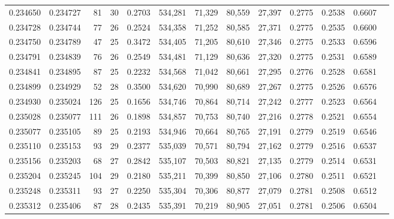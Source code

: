 \begin{tabular}{rrrrrrrrrrrrr}
0.234650 & 0.234727 &  81 &  30 &                                     0.2703 & 534,281 &  71,329 &  80,559 &  27,397 & 0.2775 & 0.2538 & 0.6607 \\
0.234728 & 0.234744 &  77 &  26 &                                     0.2524 & 534,358 &  71,252 &  80,585 &  27,371 & 0.2775 & 0.2535 & 0.6600 \\
0.234750 & 0.234789 &  47 &  25 &                                     0.3472 & 534,405 &  71,205 &  80,610 &  27,346 & 0.2775 & 0.2533 & 0.6596 \\
0.234791 & 0.234839 &  76 &  26 &                                     0.2549 & 534,481 &  71,129 &  80,636 &  27,320 & 0.2775 & 0.2531 & 0.6589 \\
0.234841 & 0.234895 &  87 &  25 &                                     0.2232 & 534,568 &  71,042 &  80,661 &  27,295 & 0.2776 & 0.2528 & 0.6581 \\
0.234899 & 0.234929 &  52 &  28 &                                     0.3500 & 534,620 &  70,990 &  80,689 &  27,267 & 0.2775 & 0.2526 & 0.6576 \\
0.234930 & 0.235024 & 126 &  25 &                                     0.1656 & 534,746 &  70,864 &  80,714 &  27,242 & 0.2777 & 0.2523 & 0.6564 \\
0.235028 & 0.235077 & 111 &  26 &                                     0.1898 & 534,857 &  70,753 &  80,740 &  27,216 & 0.2778 & 0.2521 & 0.6554 \\
0.235077 & 0.235105 &  89 &  25 &                                     0.2193 & 534,946 &  70,664 &  80,765 &  27,191 & 0.2779 & 0.2519 & 0.6546 \\
0.235110 & 0.235153 &  93 &  29 &                                     0.2377 & 535,039 &  70,571 &  80,794 &  27,162 & 0.2779 & 0.2516 & 0.6537 \\
0.235156 & 0.235203 &  68 &  27 &                                     0.2842 & 535,107 &  70,503 &  80,821 &  27,135 & 0.2779 & 0.2514 & 0.6531 \\
0.235204 & 0.235245 & 104 &  29 &                                     0.2180 & 535,211 &  70,399 &  80,850 &  27,106 & 0.2780 & 0.2511 & 0.6521 \\
0.235248 & 0.235311 &  93 &  27 &                                     0.2250 & 535,304 &  70,306 &  80,877 &  27,079 & 0.2781 & 0.2508 & 0.6512 \\
0.235312 & 0.235406 &  87 &  28 &                                     0.2435 & 535,391 &  70,219 &  80,905 &  27,051 & 0.2781 & 0.2506 & 0.6504 \\

\end{tabular}
